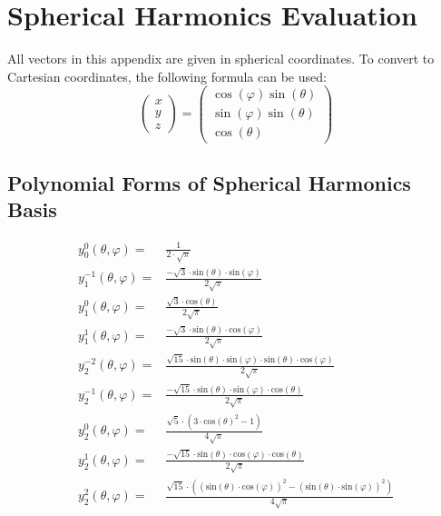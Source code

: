 \documentclass[thesis.tex]{subfiles}
\begin{document}
\appendix

\chapter{Spherical Harmonics Evaluation} 
All vectors in this appendix are given in spherical coordinates.
To convert to Cartesian coordinates, the following formula can be used:
\begin{equation}
\begin{pmatrix}x\\y\\z\end{pmatrix} = \begin{pmatrix}\cos(\varphi)\sin(\theta)\\ \sin(\varphi)\sin(\theta)\\ \cos(\theta)\end{pmatrix}
\end{equation}

\section{Polynomial Forms of Spherical Harmonics Basis}
\begin{align}
y^0_0(\theta, \varphi) =& \frac{1}{2\cdot \sqrt{\pi }} \\
y^{-1}_1(\theta, \varphi) =& \frac{-\sqrt{3}\cdot \mathrm{sin}\left( \theta\right) \cdot \mathrm{sin}\left( \varphi\right) }{2 \sqrt{\pi }} \\
y^0_1(\theta, \varphi) =& \frac{\sqrt{3}\cdot \mathrm{cos}\left( \theta\right) }{2 \sqrt{\pi }} \\
y^1_1(\theta, \varphi) =& \frac{-\sqrt{3}\cdot \mathrm{sin}\left( \theta\right) \cdot \mathrm{cos}\left( \varphi\right) }{2 \sqrt{\pi }} \\
y^{-2}_2(\theta, \varphi) =& \frac{\sqrt{15}\cdot \mathrm{sin}\left( \theta\right) \cdot \mathrm{sin}\left( \varphi\right) \cdot \mathrm{sin}\left( \theta\right) \cdot \mathrm{cos}\left( \varphi\right) }{2 \sqrt{\pi }} \\
y^{-1}_2(\theta, \varphi) =& \frac{-\sqrt{15}\cdot \mathrm{sin}\left( \theta\right) \cdot \mathrm{sin}\left( \varphi\right) \cdot \mathrm{cos}\left( \theta\right) }{2 \sqrt{\pi }} \\
y^0_2(\theta, \varphi) =& \frac{\sqrt{5}\cdot \left( 3\cdot {{\mathrm{cos}\left( \theta\right) }^{2}}-1\right) }{4 \sqrt{\pi }} \\
y^{1}_2(\theta, \varphi) =& \frac{-\sqrt{15}\cdot \mathrm{sin}\left( \theta\right) \cdot \mathrm{cos}\left( \varphi\right) \cdot \mathrm{cos}\left( \theta\right) }{2 \sqrt{\pi }} \\
y^{2}_2(\theta, \varphi) =& \frac{\sqrt{15}\cdot \left( {{\left( \mathrm{sin}\left( \theta\right) \cdot \mathrm{cos}\left( \varphi\right) \right) }^{2}}-{{\left( \mathrm{sin}\left( \theta\right) \cdot \mathrm{sin}\left( \varphi\right) \right) }^{2}}\right) }{4 \sqrt{\pi }}
\end{align}
\end{document}
